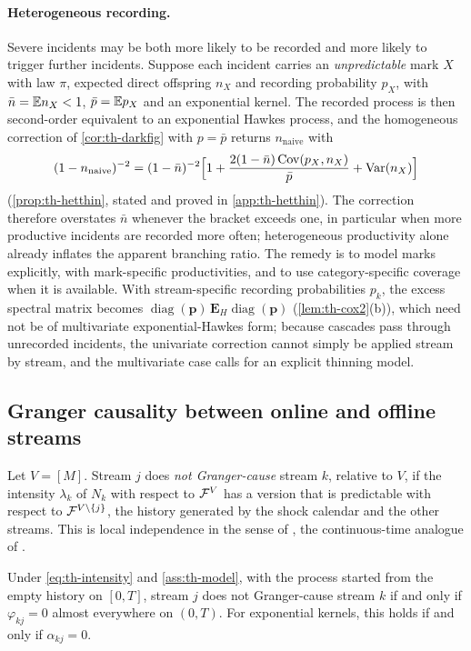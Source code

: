 \paragraph{Heterogeneous recording.} Severe incidents may be both more likely to be
recorded and more likely to trigger further incidents. Suppose each incident carries an
\emph{unpredictable} mark $X$ with law $\pi$, expected direct offspring $n_X$ and recording
probability $p_X$, with $\bar n=\mathbb{E} n_X<1$, $\bar p=\mathbb{E} p_X$ and an exponential kernel. The
recorded process is then second-order equivalent to an exponential Hawkes process, and
the homogeneous correction of \cref{cor:th-darkfig} with $p=\bar p$ returns
$n_{\mathrm{naive}}$ with
\[
(1-n_{\mathrm{naive}})^{-2}=(1-\bar n)^{-2}\Big[1+\frac{2(1-\bar n)\operatorname{Cov}(p_X,n_X)}{\bar p}+\operatorname{Var}(n_X)\Big]
\]
(\cref{prop:th-hetthin}, stated and proved in \cref{app:th-hetthin}). The correction
therefore overstates $\bar n$ whenever the bracket exceeds one, in particular when more
productive incidents are recorded more often; heterogeneous productivity alone already
inflates the apparent branching ratio. The remedy is to model marks explicitly, with
mark-specific productivities, and to use category-specific coverage when it is available.
With stream-specific recording probabilities $p_k$, the excess spectral matrix becomes
$\operatorname{diag}(\bm p)\,\bm E_H\operatorname{diag}(\bm p)$ (\cref{lem:th-cox2}(b)), which
need not be of multivariate exponential-Hawkes form; because cascades pass through
unrecorded incidents, the univariate correction cannot simply be applied stream by stream,
and the multivariate case calls for an explicit thinning model.

\subsection{Granger causality between online and offline streams}\label{sec:th-granger}

Let $V=[M]$. Stream $j$ does \emph{not Granger-cause} stream $k$, relative to $V$, if
the intensity $\lambda_k$ of $N_k$ with respect to $\mathcal{F}^V$ has a version that is
predictable with respect to $\mathcal{F}^{V\setminus\{j\}}$, the history generated by the
shock calendar and the other streams. This is local independence in the sense of
\citet{didelez2008}, the continuous-time analogue of \citet{granger1969}.

\begin{proposition}\label{prop:granger}
Under \eqref{eq:th-intensity} and \cref{ass:th-model}, with the process started from
the empty history on $[0,T]$, stream $j$ does not Granger-cause stream $k$ if and only
if $\varphi_{kj}=0$ almost everywhere on $(0,T)$. For exponential kernels, this holds
if and only if $\alpha_{kj}=0$.
\end{proposition}

